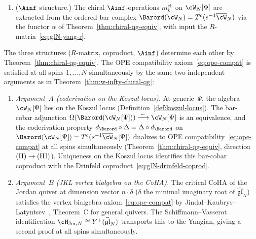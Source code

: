 \begin{theorem}
\begin{enumerate}[label=\textup{(\Roman*)}]
\begin{equation}
    = \sum_{\sigma \in S_N}
    \mathrm{sgn}(\sigma)\,
    \prod_{i=1}^{N}
    T_{i,\sigma(i)}\bigl(u - (i-1)\Psi\bigr)
  \end{equation}
  is \emph{central} in $Y(\mathfrak{gl}_N)$: it commutes
  with all $t_{ij}(v)$. In the evaluation representation,
  $\mathrm{qdet}\, T(u)$ is proportional to the identity
  on~$\CC^N$ \textup{(}verified numerically at
  $N = 2, 3$\textup{)}.
  The $\Psi$-shift $u \mapsto u - (i-1)\Psi$
  is the quantum correction to the classical determinant
  $\det T(u)$.
\item \textup{($\Ainf$ structure.)}
  The chiral $\Ainf$-operations $m_k^{\mathrm{ch}}$ on
  $\cW_N[\Psi]$ are extracted from the ordered bar complex
  $\Barord(\cW_N) = T^c(s^{-1}\overline{\cW}_N)$ via the
  functor $\alpha$ of
  Theorem~\textup{\ref{thm:chiral-qg-equiv}}, with
  input the $R$-matrix~\eqref{eq:glN-yang-r}.
\end{enumerate}
The three structures \textup{(}$R$-matrix, coproduct,
$\Ainf$\textup{)} determine each other by
Theorem~\textup{\ref{thm:chiral-qg-equiv}}.
The OPE compatibility axiom~\eqref{eq:ope-compat}
is satisfied at all spins $1, \ldots, N$ simultaneously
by the same two independent arguments as in
Theorem~\textup{\ref{thm:w-infty-chiral-qg}}:
\begin{enumerate}[label=\textup{(\alph*)}]
\item \emph{Argument~$A$ \textup{(}coderivation on the
  Koszul locus\textup{)}.}
  At generic~$\Psi$, the algebra $\cW_N[\Psi]$ lies on the
  Koszul locus
  \textup{(}Definition~\textup{\ref{def:koszul-locus}}\textup{)}.
  The bar-cobar adjunction
  $\Omega(\Barord(\cW_N[\Psi]))
  \xrightarrow{\;\sim\;} \cW_N[\Psi]$
  is an equivalence, and the coderivation property
  $d_{\Barord} \circ \Delta = \Delta \circ d_{\Barord}$
  on $\Barord(\cW_N[\Psi]) = T^c(s^{-1}\overline{\cW}_N[\Psi])$
  dualizes to OPE
  compatibility~\eqref{eq:ope-compat} at all spins
  simultaneously
  \textup{(}Theorem~\textup{\ref{thm:chiral-qg-equiv}},
  direction $\textup{(II)} \to \textup{(III)}$\textup{)}.
  Uniqueness on the Koszul locus identifies this bar-cobar
  coproduct with the Drinfeld
  coproduct~\eqref{eq:glN-drinfeld-coprod}.
\item \emph{Argument~$B$ \textup{(}JKL vertex bialgebra
  on the CoHA\textup{)}.}
  The critical CoHA of the Jordan quiver at dimension
  vector $n \cdot \delta$ ($\delta$ the minimal imaginary
  root of $\widehat{\mathfrak{gl}}_N$) satisfies the vertex
  bialgebra axiom~\eqref{eq:ope-compat} by
  Jindal--Kaubrys--Latyntsev~\textup{\cite{JKL26}},
  Theorem~C for general quivers. The
  Schiffmann--Vasserot identification
  $\cH_{\mathrm{Jor},N} \cong Y^+(\widehat{\mathfrak{gl}}_N)$
  transports this to the Yangian, giving a second proof
  at all spins simultaneously.
\end{enumerate}
\end{theorem}

